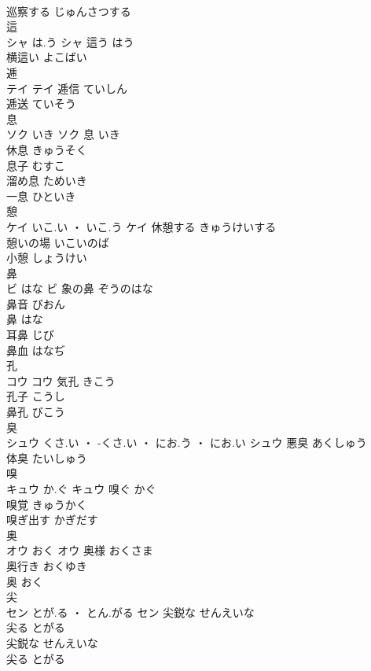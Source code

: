 \documentclass[8pt]{extreport}
\begin{document}
\begin{CJK}{UTF8}{min}
\\	巡察する	じゅんさつする	
\\	這	
\\	シャ	は.う	シャ	這う	はう	
\\	横這い	よこばい	
\\	逓	
\\	テイ		テイ	逓信	ていしん	
\\	逓送	ていそう	
\\	息	
\\	ソク	いき	ソク	息	いき	
\\	休息	きゅうそく	
\\	息子	むすこ	
\\	溜め息	ためいき	
\\	一息	ひといき	
\\	憩	
\\	ケイ	いこ.い ・ いこ.う	ケイ	休憩する	きゅうけいする	
\\	憩いの場	いこいのば	
\\	小憩	しょうけい	
\\	鼻	
\\	ビ	はな	ビ	象の鼻	ぞうのはな	
\\	鼻音	びおん	
\\	鼻	はな	
\\	耳鼻	じび	
\\	鼻血	はなぢ	
\\	孔	
\\	コウ		コウ	気孔	きこう	
\\	孔子	こうし	
\\	鼻孔	びこう	
\\	臭	
\\	シュウ	くさ.い ・ -くさ.い ・ にお.う ・ にお.い	シュウ													悪臭	あくしゅう	
\\	体臭	たいしゅう	
\\	嗅	
\\	キュウ	か.ぐ	キュウ	嗅ぐ	かぐ	
\\	嗅覚	きゅうかく	
\\	嗅ぎ出す	かぎだす	
\\	奥	
\\	オウ	おく	オウ	奥様	おくさま	
\\	奥行き	おくゆき	
\\	奥	おく	
\\	尖	
\\	セン	とが.る ・ とん.がる	セン	尖鋭な	せんえいな	
\\	尖る	とがる	
\\	尖鋭な	せんえいな	
\\	尖る	とがる	

\end{CJK}
\end{document}
